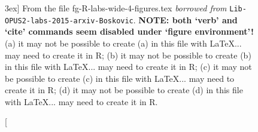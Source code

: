 \begin{figure}[t!]
\begin{minipage}{0.49\textwidth}
\end{minipage}
%
\caption[From the file fg-R-labs-wide-4-figures.tex][3ex]
{From the file fg-R-labs-wide-4-figures.tex {\em borrowed from} {\tt Lib-OPUS2-labs-2015-arxiv-Boskovic}. 
{\bf NOTE: both `verb' and `cite' commands seem disabled under `figure environment'!}
(a) 
it may not be possible to create (a) in this file with \LaTeX ... may need to create it in R;
%
(b)
it may not be possible to create (b) in this file with \LaTeX ... may need to create it in R;
%
(c)
it may not be possible to create (c) in this file with \LaTeX ... may need to create it in R;
%
(d) 
it may not be possible to create (d) in this file with \LaTeX ... may need to create it in R.
}
\label{fg-R-labs-wide-4-figures}
\end{figure}


